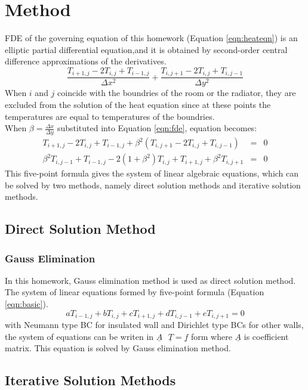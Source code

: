 \documentclass[letterpaper,12pt]{article}
\begin{document}
\section{Method}
FDE of the governing equation of this homework (Equation \ref{eqn:heateqn}) is an elliptic partial differential
equation,and it is obtained by second-order central difference approximations of the derivatives.
\begin{equation}
	\frac{T_{i+1,j}-2T_{i,j}+T_{i-1,j}}{\Delta x^2}+\frac{T_{i,j+1}-2T_{i,j}+T_{i,j-1}}{\Delta y^2}
	\label{eqn:fde}
\end{equation}
When $i$ and $j$ coincide with the boundries of the room or the radiator, they are excluded
from the solution of the heat equation since at these points the temperatures are equal to
temperatures of the boundries.\\
When $\beta = \frac{\Delta x}{\Delta y}$ substituted into Equation \ref{eqn:fde}, equation becomes:
\begin{eqnarray}
	T_{i+1,j}-2T_{i,j}+T_{i-1,j}+\beta ^2(T_{i,j+1}-2T_{i,j}+T_{i,j-1})&=&0 \nonumber \\
	\beta^2T_{i,j-1}+T_{i-1,j}-2(1+\beta^2)T_{i,j}+T_{i+1,j}+\beta ^2T_{i,j+1}&=&0 
	\label{eqn:basic}
\end{eqnarray}
This five-point formula gives the system of linear algebraic equations, which can be solved by two methods,
namely direct solution methods and iterative solution methods.
\subsection{Direct Solution Method}
\subsubsection{Gauss Elimination}
In this homework, Gauss elimination method is used as direct solution method. The system of linear
equations formed by five-point formula (Equation \ref{eqn:basic}).
\begin{equation}
	aT_{i-1,j}+bT_{i,j}+cT_{i+1,j}+dT_{i,j-1}+eT_{i,j+1}=0
\end{equation}
with Neumann type BC for insulated wall and Dirichlet type BCs for other walls,
the system of equations can be writen in $\underline{A}\mbox{ }\underline{T}=\underline{f}$ form
where $\underline{A}$ is coefficient matrix.
This equation is solved by Gauss elimination method.

\subsection{Iterative Solution Methods}
\label{subsec:iterative}
\end{document}
